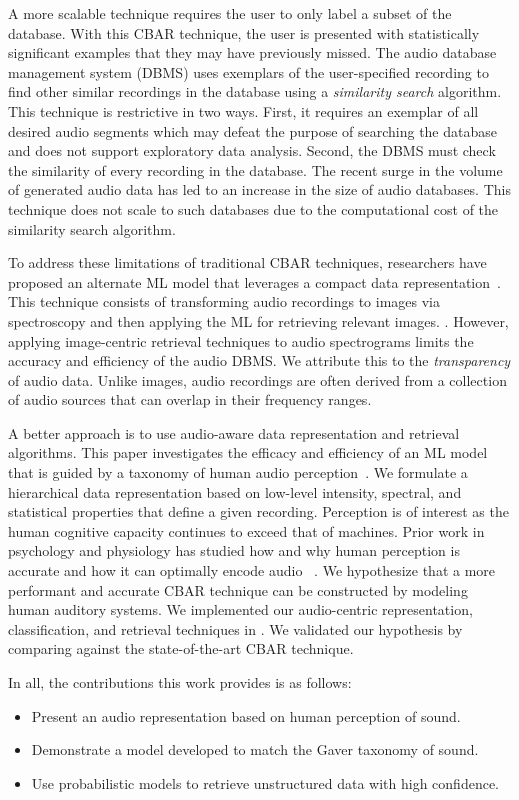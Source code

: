 A more scalable technique requires the user to only label a subset of the
database.
With this CBAR technique, the user is presented with statistically significant
examples that they may have previously missed.
The audio database management system (DBMS) uses exemplars of the 
user-specified recording to find other similar recordings in the database
using a \textit{similarity search} algorithm.
This technique is restrictive in two ways.
First, it requires an exemplar of all desired audio segments which may defeat
the purpose of searching the database and does not support exploratory data
analysis. 
Second, the DBMS must check the similarity of every recording in the database.
The recent surge in the volume of generated audio data has led to an increase 
in the size of audio databases. This technique does not scale to such 
databases due to the computational cost of the similarity search algorithm.

To address these limitations of traditional CBAR techniques, researchers have
proposed an alternate ML model that leverages a compact data
representation~\cite{Chechik2008}. This technique consists of transforming
audio recordings to images via spectroscopy and then applying the ML for
retrieving relevant images. .
However, applying image-centric retrieval techniques to audio spectrograms
limits the accuracy and efficiency of the audio DBMS.
We attribute this to the \textit{transparency} of audio data. 
Unlike images, audio recordings are often derived from a collection of audio
sources that can overlap in their frequency ranges.

A better approach is to use audio-aware data representation and retrieval
algorithms. This paper investigates the efficacy and efficiency of an ML 
model that is guided by a taxonomy of human audio perception~\cite{Gaver1993}.
We formulate a hierarchical data representation based on low-level intensity,
spectral, and statistical properties that define a given recording. 
Perception is of interest as the human cognitive capacity continues to exceed
that of machines. Prior work in psychology and physiology has studied 
how and why human perception is accurate and how it can optimally encode audio
~\cite{Gaver1993, Eggermont2001, slaney1993importance, Piazza2013}.
We hypothesize that a more performant and accurate CBAR technique can be
constructed by modeling human auditory systems.
We implemented our audio-centric representation, classification, and retrieval
techniques in \sys. We validated our hypothesis by comparing \sys against 
the state-of-the-art CBAR technique.

In all, the contributions this work provides is as follows:
\begin{itemize}
    \item Present an audio representation based on human perception of sound.
    \item Demonstrate a model developed to match the Gaver taxonomy of sound.
    \item Use probabilistic models to retrieve unstructured data with high confidence.
\end{itemize}